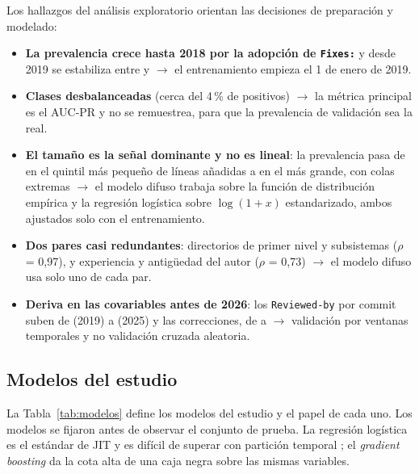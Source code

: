Los hallazgos del análisis exploratorio orientan las decisiones de preparación y modelado:
\begin{itemize}
\item \textbf{La prevalencia crece hasta 2018 por la adopción de \texttt{Fixes:}} y desde 2019 se estabiliza entre \cifPrevMin{} y \cifPrevMax{} $\rightarrow$ el entrenamiento empieza el 1 de enero de 2019.
\item \textbf{Clases desbalanceadas} (cerca del 4\,\% de positivos) $\rightarrow$ la métrica principal es el AUC-PR \cite{Saito2015} y no se remuestrea, para que la prevalencia de validación sea la real.
\item \textbf{El tamaño es la señal dominante y no es lineal}: la prevalencia pasa de \cifPrevQunoAdd{} en el quintil más pequeño de líneas añadidas a \cifPrevQcincoAdd{} en el más grande, con colas extremas $\rightarrow$ el modelo difuso trabaja sobre la función de distribución empírica y la regresión logística sobre $\log(1+x)$ estandarizado, ambos ajustados solo con el entrenamiento.
\item \textbf{Dos pares casi redundantes}: directorios de primer nivel y subsistemas ($\rho$ = 0,97), y experiencia y antigüedad del autor ($\rho$ = 0,73) $\rightarrow$ el modelo difuso usa solo uno de cada par.
\item \textbf{Deriva en las covariables antes de 2026}: los \texttt{Reviewed-by} por commit suben de \cifReviewedIni{} (2019) a \cifReviewedFin{} (2025) y las correcciones, de \cifFixIni{} a \cifFixFin{} $\rightarrow$ validación por ventanas temporales y no validación cruzada aleatoria.
\end{itemize}

\subsection{Modelos del estudio}
La Tabla~\ref{tab:modelos} define los modelos del estudio y el papel de cada uno. Los modelos se fijaron antes de observar el conjunto de prueba. La regresión logística es el estándar de JIT y es difícil de superar con partición temporal \cite{Kamei2013,Zeng2021}; el \emph{gradient boosting} \cite{Friedman2001} da la cota alta de una caja negra sobre las mismas variables.

